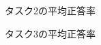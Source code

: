 \documentclass[syuuron]{kuee}
\begin{document}
		\begin{figure}
			\begin{center}
			\end{center}
			\caption{タスク2の平均正答率}
	  		\label{fig:res5}
		\end{figure}
		\begin{figure}
			\begin{center}
			\end{center}
			\caption{タスク3の平均正答率}
	  		\label{fig:res6}
		\end{figure}
\end{document}
